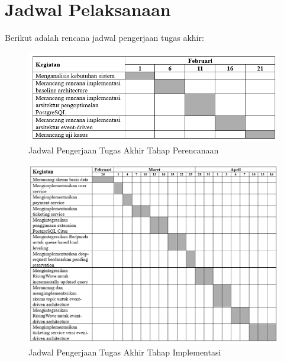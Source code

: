 \section{Jadwal Pelaksanaan}

Berikut adalah rencana jadwal pengerjaan tugas akhir:

\begin{figure}[htbp]
    \centering
    \includegraphics[width=1\textwidth]{resources/schedule/jadwal-1.png}
    \caption{Jadwal Pengerjaan Tugas Akhir Tahap Perencanaan}
    \label{fig:jadwal pelaksanaan perencanaan}
\end{figure}

\begin{figure}[htbp]
    \centering
    \includegraphics[width=1\textwidth]{resources/schedule/jadwal-2.png}
    \caption{Jadwal Pengerjaan Tugas Akhir Tahap Implementasi}
    \label{fig:jadwal pelaksanaan implementasi}
\end{figure}

\pagebreak

